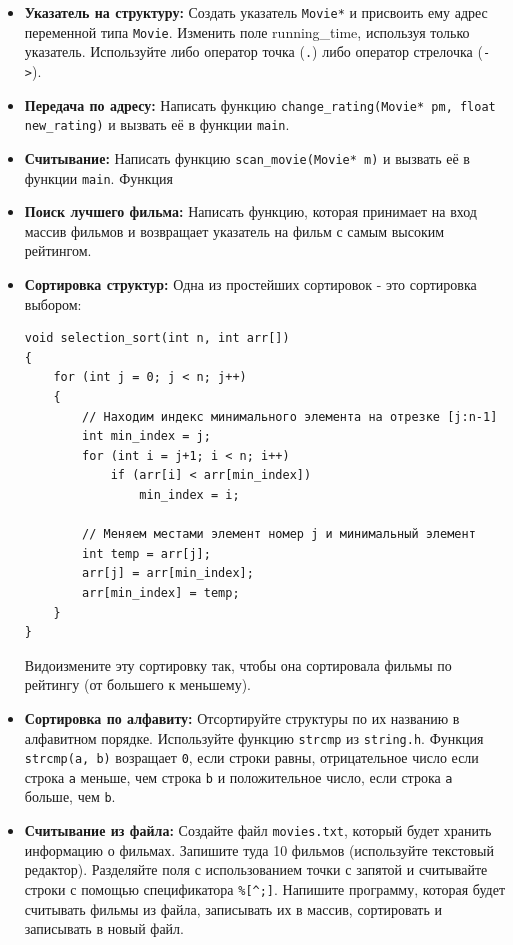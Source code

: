 \documentclass{article}
\begin{document}
\begin{itemize}
\item \textbf{Указатель на структуру:} Создать указатель \texttt{Movie*} и присвоить ему адрес переменной типа \texttt{Movie}.  Изменить поле running\_time, используя только указатель.  Используйте либо оператор точка (\texttt{.}) либо оператор стрелочка (\texttt{->}).
\item \textbf{Передача по адресу:} Написать функцию \texttt{change\_rating(Movie* pm, float new\_rating)} и вызвать её в функции \texttt{main}.
\item \textbf{Считывание:} Написать функцию \texttt{scan\_movie(Movie* m)} и вызвать её в функции \texttt{main}. Функция

\item \textbf{Поиск лучшего фильма:} Написать функцию, которая принимает на вход массив фильмов и возвращает указатель на фильм с самым высоким рейтингом.
\item \textbf{Сортировка структур:} Одна из простейших сортировок - это сортировка выбором:
\begin{lstlisting}
void selection_sort(int n, int arr[])
{
	for (int j = 0; j < n; j++)
	{
		// Находим индекс минимального элемента на отрезке [j:n-1]
		int min_index = j;
		for (int i = j+1; i < n; i++)
			if (arr[i] < arr[min_index])
				min_index = i;
		
		// Меняем местами элемент номер j и минимальный элемент
		int temp = arr[j];
		arr[j] = arr[min_index];
		arr[min_index] = temp;
	}
}
\end{lstlisting}
Видоизмените эту сортировку так, чтобы она сортировала фильмы по рейтингу (от большего к меньшему).
\item \textbf{Сортировка по алфавиту:} Отсортируйте структуры по их названию в алфавитном порядке. Используйте функцию \texttt{strcmp} из \texttt{string.h}. Функция \texttt{strcmp(a, b)} возращает \texttt{0}, если строки равны, отрицательное число если строка \texttt{a} меньше, чем строка \texttt{b} и положительное число, если строка \texttt{a} больше, чем \texttt{b}. 
\item \textbf{Считывание из файла:} Создайте файл \texttt{movies.txt}, который будет хранить информацию о фильмах. Запишите туда 10 фильмов (используйте текстовый редактор). Разделяйте поля с использованием точки с запятой и считывайте строки с помощью спецификатора \verb|%[^;]|.
Напишите программу, которая будет считывать фильмы из файла, записывать их в массив, сортировать и записывать в новый файл.
\end{itemize}
\end{document}
